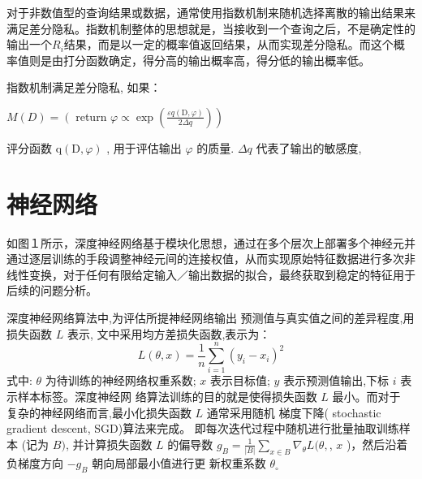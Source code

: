 对于非数值型的查询结果或数据，通常使用指数机制来随机选择离散的输出结果来满足差分隐私。指数机制整体的思想就是，当接收到一个查询之后，不是确定性的输出一个$R_{i}$结果，而是以一定的概率值返回结果，从而实现差分隐私。而这个概率值则是由打分函数确定，得分高的输出概率高，得分低的输出概率低。

\begin{define}[指数机制]\label{指数机制}
指数机制满足差分隐私, 如果：

$M(D)=\left(\right.$ return $\left.\varphi \propto \exp \left(\frac{\varepsilon q(\mathrm{D}, \varphi)}{2 \Delta q}\right)\right)$
\end{define}
评分函数 $\mathrm{q}(\mathrm{D}, \varphi)$ , 用于评估输出 $\varphi$ 的质量. $\Delta q$ 代表了输出的敏感度, 


\section{神经网络}
如图１所示，深度神经网络基于模块化思想，通过在多个层次上部署多个神经元并通过逐层训练的手段调整神经元间的连接权值，从而实现原始特征数据进行多次非线性变换，对于任何有限给定输入／输出数据的拟合，最终获取到稳定的特征用于后续的问题分析。

深度神经网络算法中,为评估所提神经网络输出 预测值与真实值之间的差异程度,用损失函数 $L$ 表示, 文中采用均方差损失函数,表示为：
$$
L(\theta, x)=\frac{1}{n} \sum_{i=1}^{n}\left(y_{i}-x_{i}\right)^{2}
$$
式中: $\theta$ 为待训练的神经网络权重系数; $x$ 表示目标值; $y$ 表示预测值输出,下标 $i$ 表示样本标签。深度神经网 络算法训练的目的就是使得损失函数 $L$ 最小。而对于 复杂的神经网络而言,最小化损失函数 $L$ 通常采用随机 梯度下降( stochastic gradient descent, SGD)算法来完成。 即每次迭代过程中随机进行批量抽取训练样本 (记为 $B)$, 并计算损失函数 $L$ 的偏导数 $g_{B}=\frac{1}{|B|} \sum_{x \in B} \nabla_{\theta} L(\theta,$, $x$ )，然后沿着负梯度方向 $-g_{B}$ 朝向局部最小值进行更 新权重系数 $\theta_{\circ}$



